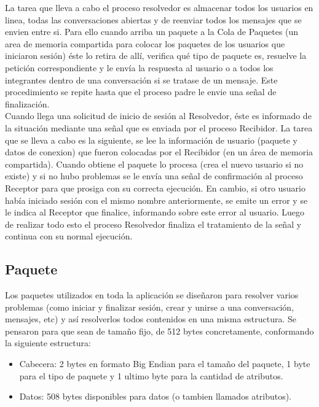 \documentclass[a4paper,12pt,titlepage]{article}
\begin{document}
La tarea que lleva a cabo el proceso resolvedor es almacenar todos los usuarios en linea, todas las conversaciones abiertas y de reenviar 
todos los mensajes que se envien entre si. Para ello cuando arriba un paquete a la Cola de Paquetes (un area de memoria compartida para colocar 
los paquetes de los usuarios que iniciaron sesión) éste lo retira de allí, verifica qué tipo de paquete es, resuelve la petición correspondiente y 
le envía la respuesta al usuario o a todos los integrantes dentro de una conversación si se tratase de un mensaje. Este procedimiento se repite 
hasta que el proceso padre le envie una señal de finalización.\\

Cuando llega una solicitud de inicio de sesión al Resolvedor, éste es informado de la situación mediante una señal que es enviada por el proceso 
Recibidor. La tarea que se lleva a cabo es la siguiente, se lee la información de usuario (paquete y datos de conexion) que fueron colocadas por 
el Recibidor (en un área de memoria compartida). Cuando obtiene el paquete lo procesa (crea el nuevo usuario si no existe) y si no hubo problemas 
se le envía una señal de confirmación al proceso Receptor para que prosiga con su correcta ejecución. En cambio, si otro usuario había iniciado 
sesión con el mismo nombre anteriormente, se emite un error y se le indica al Receptor que finalice, informando sobre este error al usuario. Luego 
de realizar todo esto el proceso Resolvedor finaliza el tratamiento de la señal y continua con su normal ejecución.\\

\subsection{Paquete}
Los paquetes utilizados en toda la aplicación se diseñaron para resolver varios problemas (como iniciar y finalizar sesión, crear y unirse a una 
conversación, mensajes, etc) y así resolverlos todos contenidos en una misma estructura.
Se pensaron para que sean de tamaño fijo, de 512 bytes concretamente, conformando la siguiente estructura:

\begin{itemize}
\item Cabecera: 2 bytes en formato Big Endian para el tamaño del paquete, 1 byte para el tipo de paquete y 1 ultimo byte para la cantidad de atributos.
\item Datos: 508 bytes disponibles para datos (o tambien llamados atributos).
\end{itemize}\\
\end{document}
